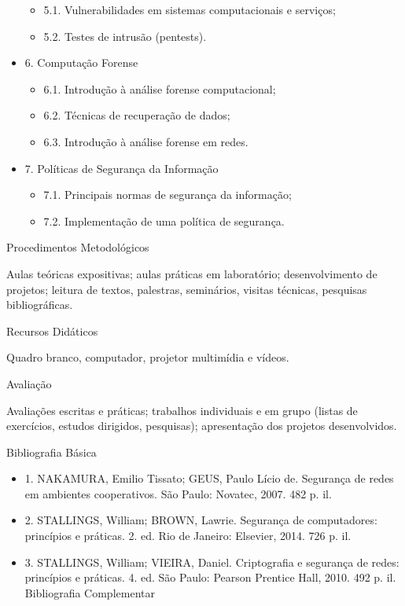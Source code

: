 \documentclass{article}
\begin{document}
\begin{itemize}
      \begin{itemize} 
            \item 5.1. Vulnerabilidades em sistemas computacionais e serviços;
            \item 5.2. Testes de intrusão (pentests).
      \end{itemize}
      \item 6. Computação Forense
      \begin{itemize} 
            \item 6.1. Introdução à análise forense computacional;
            \item 6.2. Técnicas de recuperação de dados;
            \item 6.3. Introdução à análise forense em redes.
      \end{itemize}
      \item 7. Políticas de Segurança da Informação
      \begin{itemize} 
            \item 7.1. Principais normas de segurança da informação;
            \item 7.2. Implementação de uma política de segurança.
      \end{itemize}
\end{itemize}

\begin{center}
Procedimentos Metodológicos
\end{center}
Aulas teóricas expositivas; aulas práticas em laboratório; desenvolvimento de projetos; leitura de
textos, palestras, seminários, visitas técnicas, pesquisas bibliográficas.

\begin{center}
Recursos Didáticos
\end{center}
Quadro branco, computador, projetor multimídia e vídeos.

\begin{center}
Avaliação
\end{center}
Avaliações escritas e práticas; trabalhos individuais e em grupo (listas de exercícios, estudos dirigidos,
pesquisas); apresentação dos projetos desenvolvidos.

\begin{center}
Bibliografia Básica
\end{center}
\begin{itemize}
      \item 1. NAKAMURA, Emilio Tissato; GEUS, Paulo Lício de. Segurança de redes em ambientes cooperativos. São Paulo: Novatec, 2007. 482 p. il.
      \item 2. STALLINGS, William; BROWN, Lawrie. Segurança de computadores: princípios e práticas. 2. ed. Rio de Janeiro: Elsevier, 2014. 726 p. il.
      \item 3. STALLINGS, William; VIEIRA, Daniel. Criptografia e segurança de redes: princípios e práticas. 4. ed. São Paulo: Pearson Prentice Hall, 2010. 492 p. il. Bibliografia Complementar
\end{itemize}
\end{document}
